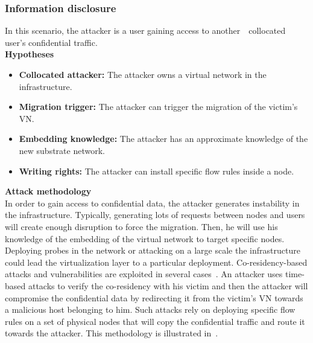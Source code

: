 \subsubsection{Information disclosure}
In this scenario, the attacker is a  user  gaining access to another　collocated user's confidential traffic.\\
\textbf{Hypotheses}
\begin{itemize}
    \item \textbf{Collocated attacker:} The attacker owns a virtual network in the infrastructure.
    \item \textbf{Migration trigger:} The attacker can trigger the migration of the victim's VN.
    \item \textbf{Embedding knowledge:} The attacker has an approximate knowledge of the new substrate network.
    \item \textbf{Writing rights:} The attacker can install specific flow rules inside a node.
\end{itemize}


\textbf{Attack methodology}\textbf{\\}
In order to gain access to confidential data, the attacker generates instability in the infrastructure. Typically, generating lots of requests between nodes and users will create enough disruption to force the migration.
Then, he will use his knowledge of the embedding of the virtual network to target specific nodes.
Deploying probes in the network or attacking on a large scale the infrastructure could lead the virtualization layer to a particular deployment. Co-residency-based attacks and vulnerabilities are exploited in several cases~\cite{malicious-atya2017,nomad-Moon2015b,getoffmucloud-Ristenpart2009,stalling-atya2017}.
An attacker uses time-based attacks to verify the co-residency with his victim and then the attacker will compromise the confidential data by redirecting it from the victim's VN towards a malicious host belonging to him.
Such attacks rely on deploying specific flow rules on a set of physical nodes that will copy the confidential traffic and route it towards the attacker.
This methodology is illustrated in~\cite{Costa2015,Sphinx-Dhawan2015}.



